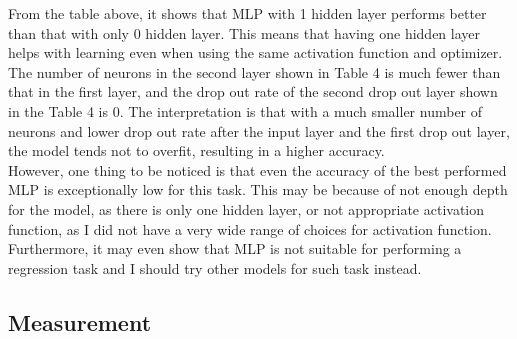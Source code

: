 \documentclass[letterpaper, 12 pt, conference]{ieeeconf}  %
\begin{document}
From the table above, it shows that MLP with 1 hidden layer performs better than that with only 0 hidden layer. This means that having one hidden layer helps with learning even when using the same activation function and optimizer. The number of neurons in the second layer shown in Table 4 is much fewer than that in the first layer, and the drop out rate of the second drop out layer shown in the Table 4 is 0. The interpretation is that with a much smaller number of neurons and lower drop out rate after the input layer and the first drop out layer, the model tends not to overfit, resulting in a higher accuracy.\\\newline
However, one thing to be noticed is that even the accuracy of the best performed MLP is exceptionally low for this task. This may be because of not enough depth for the model, as there is only one hidden layer, or not appropriate activation function, as I did not have a very wide range of choices for activation function. Furthermore, it may even show that MLP is not suitable for performing a regression task and I should try other models for such task instead.

\subsection{Measurement}
\end{document}
